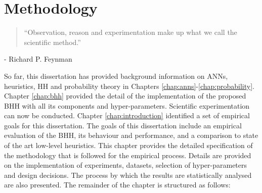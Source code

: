 \chapter{Methodology}\label{chap:methodology}

\begin{quotation}
      ``Observation, reason and experimentation make up what we call the scientific method.''
\end{quotation}
\begin{flushright}
      - Richard P. Feynman
\end{flushright}

So far, this dissertation has provided background information on \acfp{ANN}, heuristics, \acf{HH} and probability theory in Chapters \ref{chap:anns}-\ref{chap:probability}. Chapter \ref{chap:bhh} provided the detail of the implementation of the proposed \acs{BHH} with all its components and hyper-parameters. Scientific experimentation can now be conducted. Chapter \ref{chap:introduction} identified a set of empirical goals for this dissertation. The goals of this dissertation include an empirical evaluation of the \acs{BHH}, its behaviour and performance, and a comparison to state of the art low-level heuristics. This chapter provides the detailed specification of the methodology that is followed for the empirical process. Details are provided on the implementation of experiments, datasets, selection of hyper-parameters and design decisions. The process by which the results are statistically analysed are also presented. The remainder of the chapter is structured as follows:

